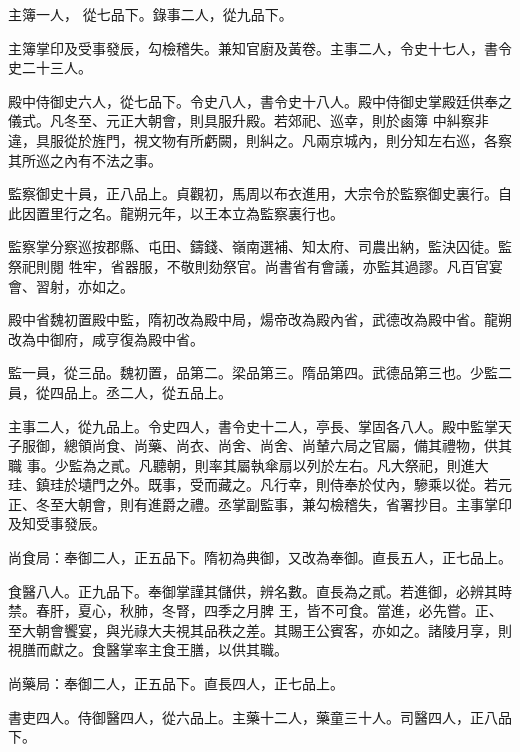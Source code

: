 \begin{pinyinscope}
 主簿一人，
 從七品下。錄事二人，從九品下。



 主簿掌印及受事發辰，勾檢稽失。兼知官廚及黃卷。主事二人，令史十七人，書令史二十三人。



 殿中侍御史六人，從七品下。令史八人，書令史十八人。殿中侍御史掌殿廷供奉之儀式。凡冬至、元正大朝會，則具服升殿。若郊祀、巡幸，則於鹵簿
 中糾察非違，具服從於旌門，視文物有所虧闕，則糾之。凡兩京城內，則分知左右巡，各察其所巡之內有不法之事。



 監察御史十員，正八品上。貞觀初，馬周以布衣進用，大宗令於監察御史裏行。自此因置里行之名。龍朔元年，以王本立為監察裏行也。



 監察掌分察巡按郡縣、屯田、鑄錢、嶺南選補、知太府、司農出納，監決囚徒。監祭祀則閱
 牲牢，省器服，不敬則劾祭官。尚書省有會議，亦監其過謬。凡百官宴會、習射，亦如之。



 殿中省魏初置殿中監，隋初改為殿中局，煬帝改為殿內省，武德改為殿中省。龍朔改為中御府，咸亨復為殿中省。



 監一員，從三品。魏初置，品第二。梁品第三。隋品第四。武德品第三也。少監二員，從四品上。丞二人，從五品上。



 主事二人，從九品上。令史四人，書令史十二人，亭長、掌固各八人。殿中監掌天子服御，總領尚食、尚藥、尚衣、尚舍、尚舍、尚輦六局之官屬，備其禮物，供其職
 事。少監為之貳。凡聽朝，則率其屬執傘扇以列於左右。凡大祭祀，則進大珪、鎮珪於壝門之外。既事，受而藏之。凡行幸，則侍奉於仗內，驂乘以從。若元正、冬至大朝會，則有進爵之禮。丞掌副監事，兼勾檢稽失，省署抄目。主事掌印及知受事發辰。



 尚食局：奉御二人，正五品下。隋初為典御，又改為奉御。直長五人，正七品上。



 食醫八人。正九品下。奉御掌謹其儲供，辨名數。直長為之貳。若進御，必辨其時禁。春肝，夏心，秋肺，冬腎，四季之月脾
 王，皆不可食。當進，必先嘗。正、至大朝會饗宴，與光祿大夫視其品秩之差。其賜王公賓客，亦如之。諸陵月享，則視膳而獻之。食醫掌率主食王膳，以供其職。



 尚藥局：奉御二人，正五品下。直長四人，正七品上。



 書吏四人。侍御醫四人，從六品上。主藥十二人，藥童三十人。司醫四人，正八品下。




\end{pinyinscope}
